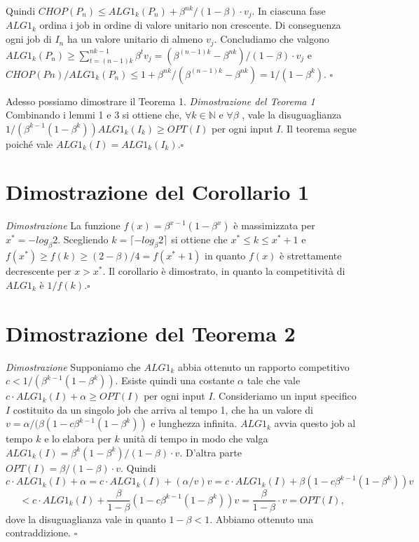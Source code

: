 \documentclass[twoside,openany,titlepage,fleqn,
	headinclude,12pt,a4paper,BCOR5mm,footinclude]{scrbook}
\newcommand*{\N}{\mathbb{N}}
\begin{document}
Quindi $CHOP(P_{n}) \leq ALG1_{k}(P_{n})+\beta^{nk}/(1-\beta ) \cdot v_{j}$. In ciascuna fase $ALG1_{k}$ ordina i job in ordine di valore unitario non crescente. Di conseguenza ogni job di $I_{n}$ ha un valore unitario di almeno $v_{j}$. Concludiamo che valgono $ALG1_{k}(P_{n}) \geq \sum^{nk-1}_{t=(n-1)k} \beta^{t} v_{j} = (\beta^{(n-1)k} - \beta^{nk})/(1 -\beta ) \cdot v_{j}$ e $CHOP(Pn)/ALG1_{k}(P_{n}) \leq 1 + \beta^{nk}/(\beta^{(n-1)k} - \beta^{nk} ) = 1/(1 - \beta^{k})$. \hfill $\square$ \vspace{5mm}

Adesso possiamo dimostrare il Teorema 1.\newline \newline
\textit{Dimostrazione del Teorema 1} Combinando i lemmi 1 e 3 si ottiene che, $\forall k \in \N$ e $\forall \beta$ , vale la disuguaglianza $1/(\beta^{k-1}(1 - \beta^{k}))ALG1_{k}(I_{k}) \geq OPT(I)$ per ogni input $I$. Il teorema segue poiché vale $ALG1_{k}(I) = ALG1_{k}(I_{k})$.\hfill $\square$ \vspace{5mm}

\section{Dimostrazione del Corollario 1}
\textit{Dimostrazione}
La funzione $f(x) = \beta^{x - 1}(1 - \beta^{x})$ è massimizzata per $x^{*} = - log_{\beta}2$. Scegliendo $k = \lceil-log_{\beta} 2\rceil$ si ottiene che $x^{*} \leq k \leq x^{*} + 1$ e $f (x^{*}) \geq f (k) \geq (2 - \beta )/4 = f (x^{*} + 1)$ in quanto $f(x)$ è strettamente decrescente per $x > x^{*}$. Il corollario è dimostrato, in quanto la competitività di $ALG1_{k}$ è $1 / f (k)$.\hfill $\square$ \vspace{5mm}
\section{Dimostrazione del Teorema 2}
\textit{Dimostrazione}
Supponiamo che $ALG1_{k}$ abbia ottenuto un rapporto competitivo $c < 1 / (\beta^{k - 1} (1 - \beta^{k}))$. Esiste quindi una costante $\alpha$ tale che vale $c \cdot ALG1_{k}(I) + \alpha \geq OPT (I)$ per ogni input $I$. Consideriamo un input specifico $I$ costituito da un singolo job che arriva al tempo 1,  che ha un valore di $v = \alpha / (\beta  (1 - c \beta^{k - 1} (1 - \beta^{k}))$ e lunghezza infinita. $ALG1_{k}$ avvia questo job al tempo $k$ e lo elabora per $k$ unità di tempo in modo che valga $ALG1_{k}(I) = \beta^{k} (1 - \beta^{k}) / (1 - \beta ) \cdot v$. D'altra parte $OPT (I) = \beta  / (1 - \beta ) \cdot v$. Quindi $$c \cdot ALG1_{k}(I) + \alpha = c \cdot ALG1_{k}(I) + (\alpha / v) v = c \cdot ALG1_{k}(I) + \beta  (1 - c\beta^{k - 1} (1 - \beta^{k})) v $$ $$< c \cdot ALG1_{k}(I) + \frac{\beta}{ 1 - \beta} (1 - c\beta^{k - 1} (1 - \beta^{k})) v = \frac{\beta}{1 - \beta} \cdot v = OPT(I),$$dove la disuguaglianza vale in quanto $1 - \beta  <1$. Abbiamo ottenuto una contraddizione. \hfill $\square$ \vspace{5mm}
\end{document}
